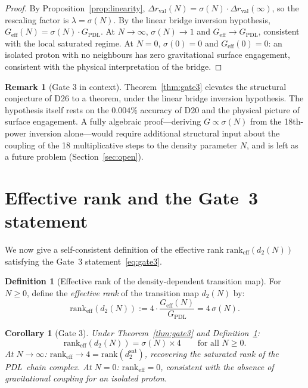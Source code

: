 \documentclass[11pt,a4paper]{article}
\newtheorem{corollary}[theorem]{Corollary}
\theoremstyle{definition}
\newtheorem{definition}[theorem]{Definition}
\newtheorem{remark}[theorem]{Remark}
\newcommand{\PDL}{\textnormal{PDL}}
\newcommand{\GPDL}{G_{\mathrm{PDL}}}
\newcommand{\Geff}{G_{\mathrm{eff}}}
\newcommand{\sig}{\sigma}
\newcommand{\dmap}{d_2}
\newcommand{\drval}{\Delta r_{\mathrm{val}}}
\begin{document}
\begin{proof}
By Proposition~\ref{prop:linearity}, $\drval(N) = \sig(N)\cdot\drval(\infty)$, so the rescaling factor is $\lambda = \sig(N)$. By the linear bridge inversion hypothesis, $\Geff(N) = \sig(N)\cdot\GPDL$. At $N \to \infty$, $\sig(N) \to 1$ and $\Geff \to \GPDL$, consistent with the local saturated regime. At $N = 0$, $\sig(0) = 0$ and $\Geff(0) = 0$: an isolated proton with no neighbours has zero gravitational surface engagement, consistent with the physical interpretation of the bridge.
\end{proof}

\begin{remark}[Gate 3 in context]
Theorem~\ref{thm:gate3} elevates the structural conjecture of D26 to a theorem, under the linear bridge inversion hypothesis. The hypothesis itself rests on the $0.004\%$ accuracy of D20 and the physical picture of surface engagement. A fully algebraic proof---deriving $G \propto \sig(N)$ from the 18th-power inversion alone---would require additional structural input about the coupling of the 18 multiplicative steps to the density parameter $N$, and is left as a future problem (Section~\ref{sec:open}).
\end{remark}

\section{Effective rank and the Gate~3 statement}
\label{sec:rank}

We now give a self-consistent definition of the effective rank $\mathrm{rank}_{\mathrm{eff}}(\dmap(N))$ satisfying the Gate~3 statement~\eqref{eq:gate3}.

\begin{definition}[Effective rank of the density-dependent transition map]
\label{def:effrank}
For $N \geq 0$, define the \emph{effective rank} of the transition map $\dmap(N)$ by:
\begin{equation}
\mathrm{rank}_{\mathrm{eff}}(\dmap(N)) := 4\cdot\frac{\Geff(N)}{\GPDL} = 4\,\sig(N).
\label{eq:effrank}
\end{equation}
\end{definition}

\begin{corollary}[Gate 3]
\label{cor:gate3}
Under Theorem~\ref{thm:gate3} and Definition~\ref{def:effrank}:
\begin{equation}
\mathrm{rank}_{\mathrm{eff}}(\dmap(N)) = \sig(N)\times 4 \qquad \text{for all } N \geq 0.
\label{eq:gate3_proved}
\end{equation}
At $N \to \infty$: $\mathrm{rank}_{\mathrm{eff}} \to 4 = \mathrm{rank}(\dmap^{\mathrm{sat}})$, recovering the saturated rank of the \PDL\ chain complex. At $N = 0$: $\mathrm{rank}_{\mathrm{eff}} = 0$, consistent with the absence of gravitational coupling for an isolated proton.
\end{corollary}
\end{document}
